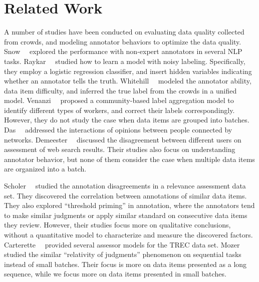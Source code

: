 \section{Related Work}
\label{sec:related}

A number of studies have been conducted on evaluating data quality collected from crowds, and modeling annotator behaviors to optimize the data quality.
Snow~\etal~\cite{snow:emnlp2008} explored the performance with non-expert annotators in several NLP tasks.
Raykar~\etal~\cite{raykar:nips2011ranking,raykar:icml2009,raykar:jmlr2010}
studied how to learn a model with noisy labeling. Specifically, they employ a logistic regression classifier, and insert hidden
variables indicating whether an annotator tells the truth. %
Whitehill~\etal~\cite{whitehill:nips2009} modeled the annotator ability, data item difficulty, and inferred the true label from the crowds in a unified model.
Venanzi~\etal~\cite{venanzi:www2014} proposed a community-based label aggregation model to identify different types of workers, 
and correct their labels correspondingly.  
However, they do not study the case when data items are grouped into batches.
Das~\etal~\cite{das:kdd2013} addressed the interactions of opinions between people connected by networks.
Demeester~\etal~\cite{demeester:wsdm2014} discussed the disagreement between different users on assessment of web search results.
Their studies also focus on understanding annotator behavior, but none of them consider the case when multiple data items are organized into a batch.

Scholer~\etal~\cite{scholer:sigir2013,scholer:sigir2011} studied the annotation disagreements in 
a relevance assessment data set.  
They discovered the correlation between annotations of similar data items.  %
They also explored ``threshold priming'' in annotation, 
where the annotators tend to make similar judgments or apply similar standard on consecutive data items they review. 
However, their studies focus more on qualitative conclusions, without a quantitative model to characterize and measure the discovered factors.  
Carterette~\etal~\cite{carterette:effect2010} provided several assessor models for the TREC data set.  
Mozer~\etal~\cite{mozer:nips2010} studied the similar ``relativity of
judgments'' phenomenon on sequential tasks instead of small batches.  
Their focus is more on data items presented as a long sequence, while we focus more on data items presented in small batches.  


